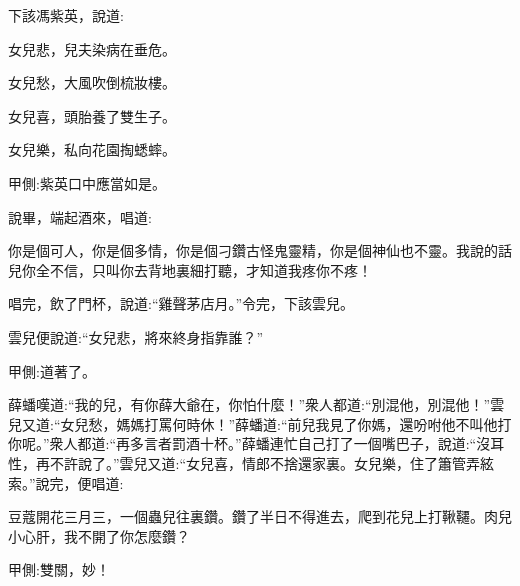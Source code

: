 \begin{parag}
    下該馮紫英，說道:
\end{parag}


\begin{poem}
    \begin{pl}女兒悲，兒夫染病在垂危。\end{pl}

    \begin{pl}女兒愁，大風吹倒梳妝樓。\end{pl}

    \begin{pl}女兒喜，頭胎養了雙生子。\end{pl}

    \begin{pl}女兒樂，私向花園掏蟋蟀。\end{pl}\begin{note}甲側:紫英口中應當如是。\end{note}
\end{poem}


\begin{parag}
    說畢，端起酒來，唱道:
\end{parag}


\begin{qute2sp}
    \begin{poem}
        \begin{pl}你是個可人，你是個多情，你是個刁鑽古怪鬼靈精，你是個神仙也不靈。我說的話兒你全不信，只叫你去背地裏細打聽，才知道我疼你不疼！\end{pl}
    \end{poem}
\end{qute2sp}


\begin{parag}
    唱完，飲了門杯，說道:“雞聲茅店月。”令完，下該雲兒。
\end{parag}


\begin{parag}
    雲兒便說道:“女兒悲，將來終身指靠誰？”\begin{note}甲側:道著了。\end{note}薛蟠嘆道:“我的兒，有你薛大爺在，你怕什麼！”衆人都道:“別混他，別混他！”雲兒又道:“女兒愁，媽媽打罵何時休！”薛蟠道:“前兒我見了你媽，還吩咐他不叫他打你呢。”衆人都道:“再多言者罰酒十杯。”薛蟠連忙自己打了一個嘴巴子，說道:“沒耳性，再不許說了。”雲兒又道:“女兒喜，情郎不捨還家裏。女兒樂，住了簫管弄絃索。”說完，便唱道:
\end{parag}

\begin{qute2sp}
    \begin{poem}
        \begin{pl}豆蔻開花三月三，一個蟲兒往裏鑽。鑽了半日不得進去，爬到花兒上打鞦韆。肉兒小心肝，我不開了你怎麼鑽？\end{pl}
        \begin{note}甲側:雙關，妙！\end{note}
    \end{poem}
\end{qute2sp}


